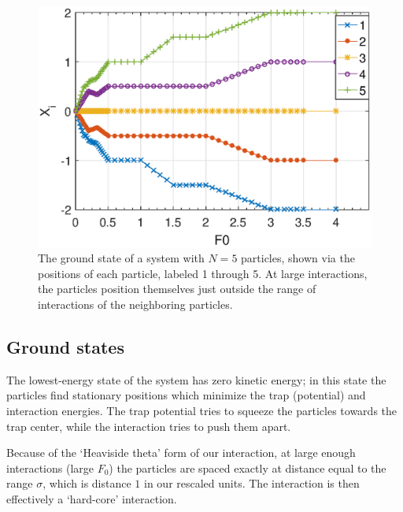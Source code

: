 \documentclass[aps,preprintnumbers,onecolumn,amsmath,amssymb,floatfix,pra]{revtex4-1}
\begin{document}
\begin{figure}[tbhp]
\centering
\includegraphics[scale=0.6]{ZhiyuPictures/N=5_GS_pre_2_rev.eps}
\caption{The ground state of a system with $N=5$ particles, shown via the positions of each
  particle, labeled 1 through 5.  At large interactions, the particles position themselves just
  outside the range of interactions of the neighboring particles.}
\label{fig:GS1}
\end{figure}





\subsection{Ground states}

The lowest-energy state of the system has zero kinetic energy; in this state the particles find
stationary positions which minimize the trap (potential) and interaction energies.  The trap
potential tries to squeeze the particles towards the trap center, while the interaction tries to push
them apart.

Because of the `Heaviside theta' form of our interaction, at large enough interactions (large $F_0$)
the particles are spaced exactly at distance equal to the range $\sigma$, which is distance $1$ in
our rescaled units.  The interaction is then effectively a `hard-core' interaction.
\end{document}
